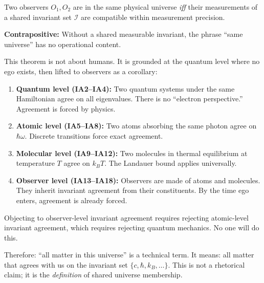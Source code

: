 \begin{theorem}\label{thm:universe-membership}
Two observers $O_1, O_2$ are in the same physical universe \emph{iff} their
measurements of a shared invariant set $\mathcal{I}$ are compatible within
measurement precision.

\textbf{Contrapositive:} Without a shared measurable invariant, the phrase
``same universe'' has no operational content.
\end{theorem}

This theorem is not about humans. It is grounded at the quantum level where
no ego exists, then lifted to observers as a corollary:

\begin{enumerate}
\item \textbf{Quantum level (IA2--IA4):} Two quantum systems under the same
  Hamiltonian agree on all eigenvalues. There is no ``electron perspective.''
  Agreement is forced by physics.

\item \textbf{Atomic level (IA5--IA8):} Two atoms absorbing the same photon
  agree on $\hbar\omega$. Discrete transitions force exact agreement.

\item \textbf{Molecular level (IA9--IA12):} Two molecules in thermal equilibrium
  at temperature $T$ agree on $k_B T$. The Landauer bound applies universally.

\item \textbf{Observer level (IA13--IA18):} Observers are made of atoms and
  molecules. They inherit invariant agreement from their constituents.
  By the time ego enters, agreement is already forced.
\end{enumerate}

\begin{corollary}\label{cor:ego-trap}
Objecting to observer-level invariant agreement requires rejecting atomic-level
invariant agreement, which requires rejecting quantum mechanics. No one will do this.
\end{corollary}

Therefore: ``all matter in this universe'' is a technical term. It means:
all matter that agrees with us on the invariant set $\{c, \hbar, k_B, \ldots\}$.
This is not a rhetorical claim; it is the \emph{definition} of shared universe membership.

